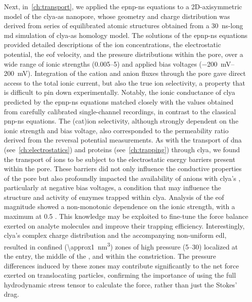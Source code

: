Next, in~\cref{ch:transport}, we applied the \gls{epnp-ns} equations to a 2D-axisymmetric model of the
\gls{clya-as} nanopore, whose geometry and charge distribution was derived from series of equilibrated atomic
structures obtained from a \SI{30}{\ns}-long \gls{md} simulation of \gls{clya-as} homology model. The
solutions of the \gls{epnp-ns} equations provided detailed descriptions of the ion concentrations, the
electrostatic potential, the \gls{eof} velocity, and the pressure distributions within the pore, over a wide
range of ionic strengths (\SIrange{0.005}{5}{\Molar}) and applied bias voltages (\SIrange{-200}{+200}{\mV}).
Integration of the cation and anion fluxes through the pore gave direct access to the total ionic current, but
also the true ion selectivity, a property that is difficult to pin down experimentally. Notably, the ionic
conductance of \gls{clya} predicted by the \gls{epnp-ns} equations matched closely with the values obtained
from carefully calibrated single-channel recordings, in contrast to the classical \gls{pnp-ns} equations. The
(cat)ion selectivity, although strongly dependent on the ionic strength and bias voltage, also corresponded to
the permeability ratio derived from the reversal potential measurements. As with the transport of \gls{dna}
(see~\cref{ch:electrostatics}) and proteins (see~\cref{ch:trapping}) through \gls{clya}, we found the
transport of ions to be subject to the electrostatic energy barriers present within the pore. These barriers did
not only influence the conductive properties of the pore but also profoundly impacted the availability of
anions with \gls{clya}'s \lumen{}, particularly at negative bias voltages, a condition that may influence the
structure and activity of enzymes trapped within \gls{clya}. Analysis of the \gls{eof} magnitude showed a
non-monotonic dependence on the ionic strength, with a maximum at \SI{0.5}{\Molar} . This knowledge
may be exploited to fine-tune the force balance exerted on analyte molecules and improve their trapping
efficiency. Interestingly, \gls{clya}'s complex charge distribution and the accompanying non-uniform
\gls{edl}, resulted in confined (\SI{\approx1}{\cubic\nm}) zones of high pressure (\SIrange{5}{30}{\atm})
localized at the \cisi{} entry, the middle of the \lumen{}, and within the \transi{} constriction. The
pressure differences induced by these zones may contribute significantly to the net force exerted on
translocating particles, confirming the importance of using the full hydrodynamic stress tensor to calculate
the force, rather than just the Stokes' drag.

